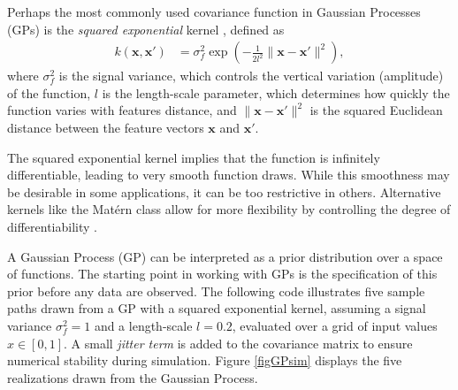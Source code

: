 Perhaps the most commonly used covariance function in Gaussian Processes (GPs) is the \textit{squared exponential} kernel \cite{jacobi2024posterior}, defined as
\begin{align*}
	k(\mathbf{x}, \mathbf{x}') & = \sigma^2_f \exp\left(-\frac{1}{2l^2} \|\mathbf{x} - \mathbf{x}'\|^2\right),
\end{align*}
where \( \sigma^2_f \) is the signal variance, which controls the vertical variation (amplitude) of the function, \( l \) is the length-scale parameter, which determines how quickly the function varies with features distance, and \( \|\mathbf{x} - \mathbf{x}'\|^2 \) is the squared Euclidean distance between the feature vectors \( \mathbf{x} \) and \( \mathbf{x}' \).

The squared exponential kernel implies that the function is infinitely differentiable, leading to very smooth function draws. While this smoothness may be desirable in some applications, it can be too restrictive in others. Alternative kernels like the Matérn class allow for more flexibility by controlling the degree of differentiability \cite{rasmussen2006gaussian}.

A Gaussian Process (GP) can be interpreted as a prior distribution over a space of functions. The starting point in working with GPs is the specification of this prior before any data are observed. The following code illustrates five sample paths drawn from a GP with a squared exponential kernel, assuming a signal variance \( \sigma_f^2 = 1 \) and a length-scale \( l = 0.2 \), evaluated over a grid of input values \( x \in [0,1] \). A small \textit{jitter term} is added to the covariance matrix to ensure numerical stability during simulation. Figure \ref{figGPsim} displays the five realizations drawn from the Gaussian Process.


